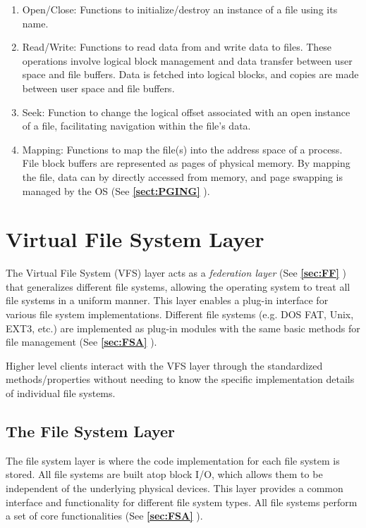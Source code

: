 \documentclass{report}
\newcommand{\refto}[2]{\textbf{\ref{#1:#2} \nameref{#1:#2}}}
\begin{document}
\begin{enumerate}[label=\textit{(\roman*)}]
\item Open/Close: Functions to initialize/destroy an instance of a file using its name.
\item Read/Write: Functions to read data from and write data to files. These operations involve
  logical block management and data transfer between user space and file buffers. Data is fetched
  into logical blocks, and copies are made between user space and file buffers.
\item Seek: Function to change the logical offset associated with an open instance of a file,
  facilitating navigation within the file's data.
\item Mapping: Functions to map the file(s) into the address space of a process. File block buffers
  are represented as pages of physical memory. By mapping the file, data can by directly accessed
  from memory, and page swapping is managed by the OS (See \refto{sect}{PGING}).
\end{enumerate}





\section{Virtual File System Layer}
The Virtual File System (VFS) layer acts as a \textit{federation layer} (See \refto{sec}{FF}) that
generalizes different file systems, allowing the operating system to treat all file systems in a
uniform manner. This layer enables a plug-in interface for various file system
implementations. Different file systems (e.g. DOS FAT, Unix, EXT3, etc.) are implemented as plug-in
modules with the same basic methods for file management (See \refto{sec}{FSA}).

Higher level clients interact with the VFS layer through the standardized methods/properties without
needing to know the specific implementation details of individual file systems.


\subsection{The File System Layer}
The file system layer is where the code implementation for each file system is stored. All file
systems are built atop block I/O, which allows them to be independent of the underlying physical
devices. This layer provides a common interface and functionality for different file system
types. All file systems perform a set of core functionalities (See \refto{sec}{FSA}).
\end{document}
